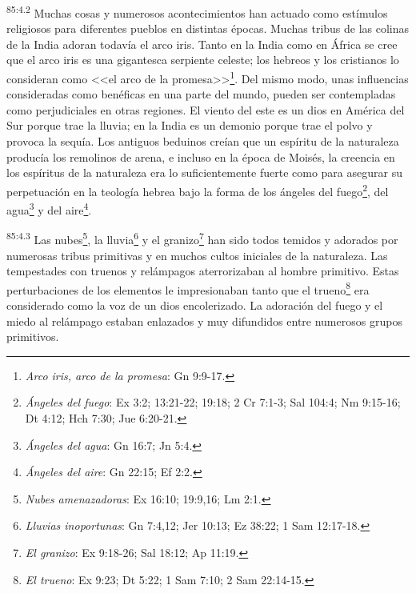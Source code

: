 \documentclass[twoside, 11pt]{book}
\begin{document}
\par
\textsuperscript{85:4.2} Muchas cosas y numerosos acontecimientos han actuado como estímulos religiosos para diferentes pueblos en distintas épocas. Muchas tribus de las colinas de la India adoran todavía el arco iris. Tanto en la India como en África se cree que el arco iris es una gigantesca serpiente celeste; los hebreos y los cristianos lo consideran como <<el arco de la promesa>>\footnote{\textit{Arco iris, arco de la promesa}: Gn 9:9-17.}. Del mismo modo, unas influencias consideradas como benéficas en una parte del mundo, pueden ser contempladas como perjudiciales en otras regiones. El viento del este es un dios en América del Sur porque trae la lluvia; en la India es un demonio porque trae el polvo y provoca la sequía. Los antiguos beduinos creían que un espíritu de la naturaleza producía los remolinos de arena, e incluso en la época de Moisés, la creencia en los espíritus de la naturaleza era lo suficientemente fuerte como para asegurar su perpetuación en la teología hebrea bajo la forma de los ángeles del fuego\footnote{\textit{Ángeles del fuego}: Ex 3:2; 13:21-22; 19:18; 2 Cr 7:1-3; Sal 104:4; Nm 9:15-16; Dt 4:12; Hch 7:30; Jue 6:20-21.}, del agua\footnote{\textit{Ángeles del agua}: Gn 16:7; Jn 5:4.} y del aire\footnote{\textit{Ángeles del aire}: Gn 22:15; Ef 2:2.}.

\par
\textsuperscript{85:4.3} Las nubes\footnote{\textit{Nubes amenazadoras}: Ex 16:10; 19:9,16; Lm 2:1.}, la lluvia\footnote{\textit{Lluvias inoportunas}: Gn 7:4,12; Jer 10:13; Ez 38:22; 1 Sam 12:17-18.} y el granizo\footnote{\textit{El granizo}: Ex 9:18-26; Sal 18:12; Ap 11:19.} han sido todos temidos y adorados por numerosas tribus primitivas y en muchos cultos iniciales de la naturaleza. Las tempestades con truenos y relámpagos aterrorizaban al hombre primitivo. Estas perturbaciones de los elementos le impresionaban tanto que el trueno\footnote{\textit{El trueno}: Ex 9:23; Dt 5:22; 1 Sam 7:10; 2 Sam 22:14-15.} era considerado como la voz de un dios encolerizado. La adoración del fuego y el miedo al relámpago estaban enlazados y muy difundidos entre numerosos grupos primitivos.
\end{document}
